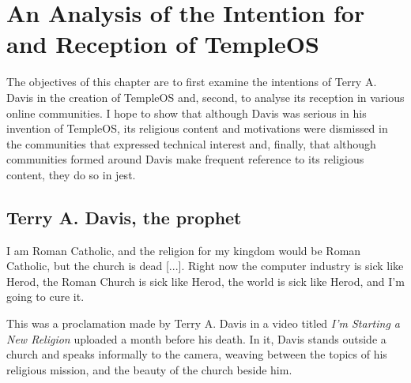 \documentclass[Draft.tex]{subfiles}
\begin{document}
\chapter{An Analysis of the Intention for and Reception of TempleOS}

The objectives of this chapter are to first examine
the intentions of Terry A. Davis in the creation of TempleOS and, second,
to analyse its reception in various online communities.
I hope to show that although Davis was serious in his invention of TempleOS,
its religious content and motivations were dismissed
in the communities that expressed technical interest and, finally,
that although communities formed around Davis make frequent reference
to its religious content, they do so in jest.

\section*{Terry A. Davis, the prophet}

\begin{displayquote}
  I am Roman Catholic, and the religion for my kingdom
  would be Roman Catholic, but the church is dead [...].
  Right now the computer industry is sick like Herod,
  the Roman Church is sick like Herod,
  the world is sick like Herod, and I'm going to cure it.
\end{displayquote}

This was a proclamation made by Terry A. Davis \parencite*{NewReligion} in a video titled
\textit{I'm Starting a New Religion} uploaded a month before his death.
In it, Davis stands outside a church and speaks informally to the camera,
weaving between the topics of his religious mission,
and the beauty of the church beside him.


\end{document}
